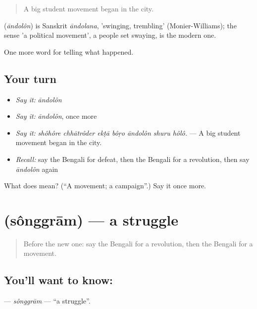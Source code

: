 \begin{quote}
A big student movement began in the city.
\end{quote}

\begin{cousinweb}
\textbf{} (\emph{āndolôn}) is Sanskrit \emph{āndolana}, 'swinging, trembling' (Monier-Williams); the sense 'a political movement', a people set swaying, is the modern one.
\end{cousinweb}

\begin{grammarlens}[title={What you've built}]
One more word for telling what happened.
\end{grammarlens}

\subsection*{Your turn}
\begin{itemize}
\raggedright
  \item \emph{Say it:} \emph{āndolôn}
  \item \emph{Say it:} \emph{āndolôn}, once more
  \item \emph{Say it:} \emph{shôhôre chhātrôder ekṭā bôṛo āndolôn shuru hôlô.} — A big student movement began in the city.
  \item \emph{Recall:} say the Bengali for defeat, then the Bengali for a revolution, then say \emph{āndolôn} again
\end{itemize}

\begin{tcolorbox}[breakable,colback=teal!4,colframe=teal!35!black,title={Before you move on}]
What does  mean? (\textquotedblleft{}A movement; a campaign\textquotedblright{}.) Say it once more.
\end{tcolorbox}
\section[\texorpdfstring{\bn{সংগ্রাম} (sônggrām)}{সংগ্রাম (sônggrām)}]{ (sônggrām) — a struggle}

\label{lesson:BN-C318-songgram}



\begin{quote}
Before the new one: say the Bengali for a revolution, then the Bengali for a movement.
\end{quote}

\subsection*{You'll want to know: }
\textbf{} — \emph{sônggrām} — \textquotedblleft{}a struggle\textquotedblright{}.

